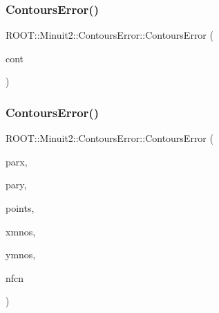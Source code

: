 \subsubsection{\texorpdfstring{ContoursError()}{ContoursError()}\hspace{0.1cm}{\footnotesize\ttfamily [2/4]}}
{\footnotesize\ttfamily R\+O\+O\+T\+::\+Minuit2\+::\+Contours\+Error\+::\+Contours\+Error (\begin{DoxyParamCaption}\item[{const \mbox{\hyperlink{classROOT_1_1Minuit2_1_1ContoursError}{Contours\+Error}} \&}]{cont }\end{DoxyParamCaption})\hspace{0.3cm}{\ttfamily [inline]}}

\mbox{\label{classROOT_1_1Minuit2_1_1ContoursError_abe494ac0098e41bf38fd4023e018e340}} 
\subsubsection{\texorpdfstring{ContoursError()}{ContoursError()}\hspace{0.1cm}{\footnotesize\ttfamily [3/4]}}
{\footnotesize\ttfamily R\+O\+O\+T\+::\+Minuit2\+::\+Contours\+Error\+::\+Contours\+Error (\begin{DoxyParamCaption}\item[{unsigned int}]{parx,  }\item[{unsigned int}]{pary,  }\item[{const std\+::vector$<$ std\+::pair$<$ double, double $>$ $>$ \&}]{points,  }\item[{const \mbox{\hyperlink{classROOT_1_1Minuit2_1_1MinosError}{Minos\+Error}} \&}]{xmnos,  }\item[{const \mbox{\hyperlink{classROOT_1_1Minuit2_1_1MinosError}{Minos\+Error}} \&}]{ymnos,  }\item[{unsigned int}]{nfcn }\end{DoxyParamCaption})\hspace{0.3cm}{\ttfamily [inline]}}

\mbox{\label{classROOT_1_1Minuit2_1_1ContoursError_a712a4699d5a022af68106524be05d862}} 

